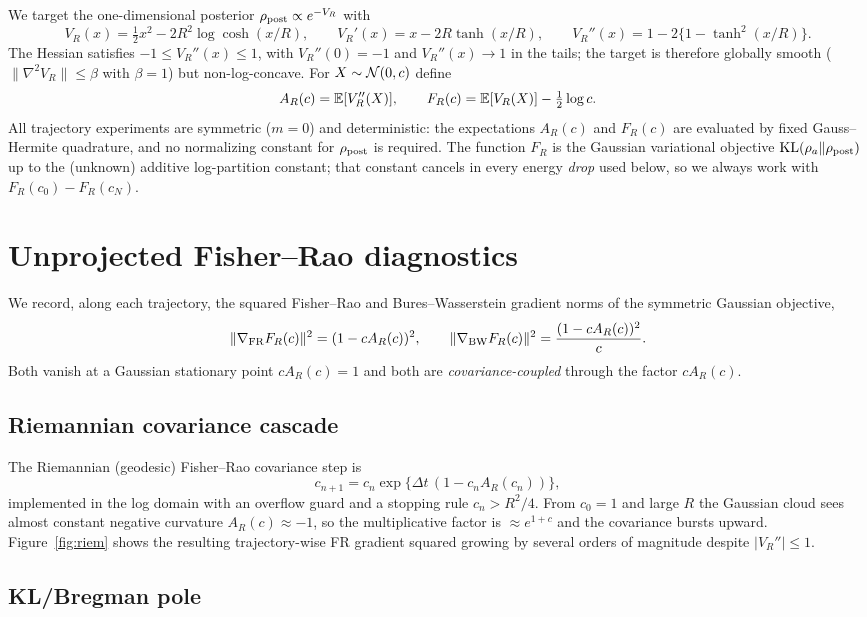 \documentclass[11pt]{article}
\begin{document}
We target the one-dimensional posterior $\rho_{\mathrm{post}}\propto e^{-V_R}$ with
\[
V_R(x)=\tfrac12 x^2-2R^2\log\cosh(x/R),\qquad
V_R'(x)=x-2R\tanh(x/R),\qquad
V_R''(x)=1-2\bigl\{1-\tanh^2(x/R)\bigr\}.
\]
The Hessian satisfies $-1\leq V_R''(x)\leq 1$, with $V_R''(0)=-1$ and
$V_R''(x)\to 1$ in the tails; the target is therefore globally smooth
($\|\nabla^2 V_R\|\le\beta$ with $\beta=1$) but non-log-concave. For
$X\sim\mathcal{N}(0,c)$ define
\[
A_R(c)=\mathbb{E}[V_R''(X)],\qquad
F_R(c)=\mathbb{E}[V_R(X)]-\tfrac12\log c .
\]
All trajectory experiments are symmetric ($m=0$) and deterministic: the
expectations $A_R(c)$ and $F_R(c)$ are evaluated by fixed Gauss--Hermite
quadrature, and no normalizing constant for $\rho_{\mathrm{post}}$ is required. The
function $F_R$ is the Gaussian variational objective $\mathrm{KL}(\rho_a\|\rho_{\mathrm{post}})$ up
to the (unknown) additive log-partition constant; that constant cancels in every
energy \emph{drop} used below, so we always work with $F_R(c_0)-F_R(c_N)$.

\section{Unprojected Fisher--Rao diagnostics}
\label{sec:unprojected}

We record, along each trajectory, the squared Fisher--Rao and Bures--Wasserstein
gradient norms of the symmetric Gaussian objective,
\[
\|\nabla_{\mathrm{FR}}F_R(c)\|^2=(1-cA_R(c))^2,\qquad
\|\nabla_{\mathrm{BW}}F_R(c)\|^2=\frac{(1-cA_R(c))^2}{c}.
\]
Both vanish at a Gaussian stationary point $cA_R(c)=1$ and both are
\emph{covariance-coupled} through the factor $cA_R(c)$.

\subsection{Riemannian covariance cascade}
\label{sec:riemannian}

The Riemannian (geodesic) Fisher--Rao covariance step is
\[
c_{n+1}=c_n\exp\{\Delta t\,(1-c_nA_R(c_n))\},
\]
implemented in the log domain with an overflow guard and a stopping rule
$c_n>R^2/4$. From $c_0=1$ and large $R$ the Gaussian cloud sees almost constant
negative curvature $A_R(c)\approx-1$, so the multiplicative factor is
$\approx e^{1+c}$ and the covariance bursts upward. Figure~\ref{fig:riem} shows
the resulting trajectory-wise FR gradient squared growing by several orders of
magnitude despite $|V_R''|\le 1$.

\subsection{KL/Bregman pole}
\label{sec:klpole}
\end{document}

